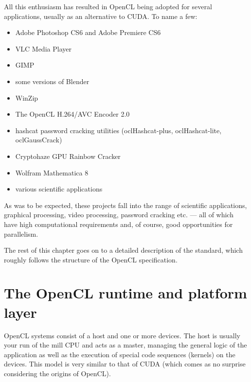 All this enthusiasm has resulted in OpenCL being adopted for several applications, usually as an alternative to CUDA. To name a few:
\begin{itemize}
\item Adobe Photoshop CS6\cite{http://helpx.adobe.com/photoshop/kb/photoshop-cs6-gpu-faq.html} and Adobe Premiere CS6\cite{http://blogs.adobe.com/premierepro/2012/05/opencl-and-premiere-pro-cs6.html}
\item VLC Media Player\cite{http://openclnews.com/apps/vlc_media_player}
\item GIMP\cite{http://www.gimp.org/}
\item some versions of Blender\cite{http://www.atmind.nl/?p=35}
\item WinZip\cite{http://www.tomshardware.com/reviews/winrar-winzip-7-zip-magicrar}
\item The OpenCL H.264/AVC Encoder 2.0\cite{http://www.mainconcept.com/products/sdks/gpu-acceleration/opencltm-h264avc.html}
\item hashcat password cracking utilities (oclHashcat-plus\cite{http://hashcat.net/oclhashcat-plus/}, oclHashcat-lite\cite{http://hashcat.net/oclhashcat-lite/}, oclGaussCrack\cite{http://hashcat.net/oclGaussCrack/})
\item Cryptohaze GPU Rainbow Cracker\cite{https://www.cryptohaze.com/gpurainbowcracker.php}
\item Wolfram Mathematica 8\cite{http://www.wolfram.com/mathematica/new-in-8/cuda-and-opencl-support/}
\item various scientific applications\cite{http://www.sciencedirect.com/science/article/pii/S0010465510001682}\cite{http://arxiv.org/abs/1002.0916}
\end{itemize}
As was to be expected, these projects fall into the range of scientific applications, graphical processing, video processing, password cracking etc. --- all of which have high computational requirements and, of course, good opportunities for parallelism.

The rest of this chapter goes on to a detailed description of the standard, which roughly follows the structure of the OpenCL \oclVersion specification\cite{oclspec}.

\section{The OpenCL runtime and platform layer}
\label{section:runtime}
OpenCL systems consist of a host and one or more devices. The host is usually your run of the mill CPU and acts as a master, managing the general logic of the application as well as the execution of special code sequences (kernels) on the devices. This model is very similar to that of CUDA (which comes as no surprise considering the origins of OpenCL).


